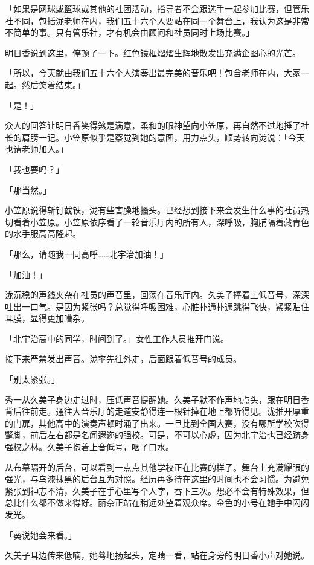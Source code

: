 \documentclass[UTF8]{ctexart}
\begin{document}
    「如果是网球或篮球或其他的社团活动，指导者不会跟选手一起参加比赛，但管乐社不同，包括泷老师在内，我们五十六个人要站在同一个舞台上，我认为这是非常不简单的事。只有管乐社，才有机会由顾问和社员同时上场比赛。」 

    明日香说到这里，停顿了一下。红色镜框熠熠生辉地散发出充满企图心的光芒。 

    「所以，今天就由我们五十六个人演奏出最完美的音乐吧！包含老师在内，大家一起。然后笑着结束。」 

    「是！」 

    众人的回答让明日香笑得煞是满意，柔和的眼神望向小笠原，再自然不过地捶了社长的肩膀一记。小笠原似乎是察觉到她的意图，用力点头，顺势转向泷说：「今天也请老师加入。」 

    「我也要吗？」 

    「那当然。」 

    小笠原说得斩钉截铁，泷有些害臊地搔头。已经想到接下来会发生什么事的社员热切看着小笠原。小笠原依序看了一轮音乐厅内的所有人，深呼吸，胸脯隔着藏青色的水手服高高隆起。 

    「那么，请随我一同高呼……北宇治加油！」 

    「加油！」 

    泷沉稳的声线夹杂在社员的声音里，回荡在音乐厅内。久美子捧着上低音号，深深吐出一口气。是因为紧张吗？总觉得呼吸困难，心脏扑通扑通跳得飞快，紧紧贴住耳膜，显得更加嘈杂。 

    「北宇治高中的同学，时间到了。」女性工作人员推开门说。 

    接下来严禁发出声音。泷率先往外走，后面跟着低音号的成员。 

    「别太紧张。」 

    秀一从久美子身边走过时，压低声音提醒她。久美子默不作声地点头，跟在明日香背后往前走。通往大音乐厅的走道安静得连一根针掉在地上都听得见。泷推开厚重的门扉，其他高中的演奏声顿时涌了出来。一旦比到全国大赛，没有哪所学校吹得蹩脚，前后左右都是名闻遐迩的强校。可是，不可以心虚，因为北宇治也已经跻身强校之林。久美子抱着上音低号，咽了口水。 

    从布幕隔开的后台，可以看到一点点其他学校正在比赛的样子。舞台上充满耀眼的强光，与乌漆抹黑的后台互为对照。经历再多待在这里的时间也不会习惯。为避免紧张到神志不清，久美子在手心里写个人字，吞下三次。想必不会有特殊效果，但总比什么都不做来得好。丽奈正站在稍远处望着观众席。金色的小号在她手中闪闪发光。 

    「葵说她会来看。」 

    久美子耳边传来低喃，她蓦地扬起头，定睛一看，站在身旁的明日香小声对她说。 
\end{document}
